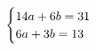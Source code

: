 \documentclass[preview]{standalone}
\begin{document}
\begin{align*}
\special{dvisvgm:raw <g id='unique000'>}\begin{cases}14a+6b=31\\6a+3b=13\end{cases}\special{dvisvgm:raw </g>}
\end{align*}
\end{document}
